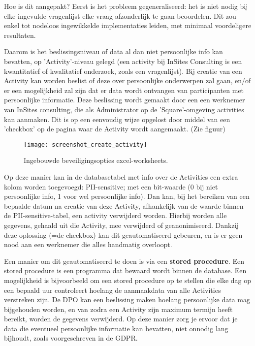 Hoe is dit aangepakt? Eerst is het probleem gegeneraliseerd: het is niet nodig bij elke ingevulde vragenlijst elke vraag afzonderlijk te gaan beoordelen. 
Dit zou enkel tot nodeloos ingewikkelde implementaties leiden, met minimaal voordeligere resultaten. 

Daarom is het beslissingsniveau of data al dan niet persoonlijke info kan bevatten, op 'Activity'-niveau gelegd (een activity bij InSites Consulting is een kwantitatief of kwalitatief onderzoek, zoals een vragenlijst). Bij creatie van een Activity kan worden beslist of deze over persoonlijke onderwerpen zal gaan, en/of er een mogelijkheid zal zijn dat er data wordt ontvangen van participanten met persoonlijke informatie. Deze beslissing wordt gemaakt door een een werknemer van InSites consulting, die als Administrator op de 'Square'-omgeving activities kan aanmaken. 
Dit is op een eenvoudig wijze opgelost door middel van een 'checkbox' op de pagina waar de Activity wordt aangemaakt. (Zie figuur) 

\begin{figure}[h]
	\centering
	\texttt{[image: screenshot\_create\_activity]}
	\label{fig:create_activity}
	\caption{Ingebouwde beveiligingsopties excel-worksheets.}
\end{figure}


Op deze manier kan in de databasetabel met info over de Activities een extra kolom worden toegevoegd: PII-sensitive; met een bit-waarde (0 bij niet persoonlijke info, 1 voor wel persoonlijke info). 
Dan kan, bij het bereiken van een bepaalde datum na creatie van deze Activity, afhankelijk van de waarde binnen de PII-sensitive-tabel, een activity verwijderd worden. Hierbij worden alle gegevens, gehaald uit die Activity, mee verwijderd of geanonimiseerd. Dankzij deze oplossing (=de checkbox) kan dit geautomatiseerd gebeuren, en is er geen nood aan een werknemer die alles handmatig overloopt. 

Een manier om dit geautomatiseerd te doen is via een \textbf{stored procedure}. Een stored procedure is een programma dat bewaard wordt binnen de database. Een mogelijkheid is bijvoorbeeld om een stored procedure op te stellen die elke dag op een bepaald uur controleert hoelang de aanmaakdata van alle Activities verstreken zijn. De DPO kan een beslissing maken hoelang persoonlijke data mag bijgehouden worden, en van zodra een Activity zijn maximum termijn heeft bereikt, worden de gegevens verwijderd. Op deze manier zorg je ervoor dat je data die eventueel persoonlijke informatie kan bevatten, niet onnodig lang bijhoudt, zoals voorgeschreven in de GDPR.  


